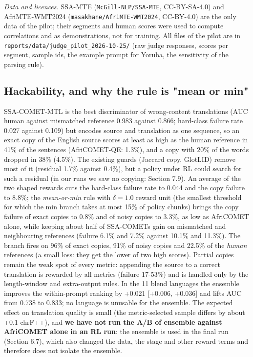 \emph{Data and licences.} SSA-MTE (\texttt{McGill-NLP/SSA-MTE}, CC-BY-SA-4.0) and AfriMTE-WMT2024 (\texttt{masakhane/AfriMTE-WMT2024}, CC-BY-4.0) are the only data of the pilot; their segments and human scores were used to compute correlations and as demonstrations, not for training. All files of the pilot are in \texttt{reports/data/judge\_pilot\_2026-10-25/} (raw judge responses, scores per segment, sample ids, the example prompt for Yoruba, the sensitivity of the parsing rule).

\subsection{Hackability, and why the rule is "mean or min"}\label{hackability-and-why-the-rule-is-mean-or-min}

SSA-COMET-MTL is the best discriminator of wrong-content translations (AUC human against mismatched reference 0.983 against 0.866; hard-class failure rate 0.027 against 0.109) but encodes source and translation as one sequence, so an exact copy of the English source scores at least as high as the human reference in 41\% of the sentences (AfriCOMET-QE: 1.3\%), and a copy with 20\% of the words dropped in 38\% (4.5\%). The existing guards (Jaccard copy, GlotLID) remove most of it (residual 1.7\% against 0.4\%), but a policy under RL could search for such a residual (in our runs we saw no copying: Section 7.9). An average of the two shaped rewards cuts the hard-class failure rate to 0.044 and the copy failure to 8.8\%; the \emph{mean-or-min} rule with \(\delta=1.0\) reward unit (the smallest threshold for which the min branch takes at most 15\% of policy chunks) brings the copy failure of exact copies to 0.8\% and of noisy copies to 3.3\%, as low as AfriCOMET alone, while keeping about half of SSA-COMET\textquotesingle s gain on mismatched and neighbouring references (failure 6.1\% and 7.2\% against 10.1\% and 11.3\%). The branch fires on 96\% of exact copies, 91\% of noisy copies and 22.5\% of the \emph{human} references (a small loss: they get the lower of two high scores). Partial copies remain the weak spot of every metric: appending the source to a correct translation is rewarded by all metrics (failure 17-53\%) and is handled only by the length-window and extra-output rules. In the 11 blend languages the ensemble improves the within-prompt ranking by +0.021 {[}+0.006, +0.036{]} and lifts AUC from 0.738 to 0.833; no language is unusable for the ensemble. The expected effect on translation quality is small (the metric-selected sample differs by about +0.1 chrF++), and \textbf{we have not run the A/B of ensemble against AfriCOMET alone in an RL run}: the ensemble is used in the final run (Section 6.7), which also changed the data, the stage and other reward terms and therefore does not isolate the ensemble.

